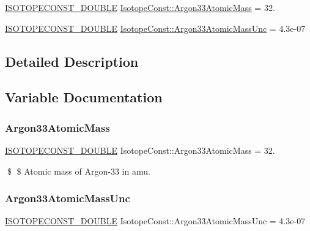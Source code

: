 \begin{DoxyCompactItemize}
\item 
\mbox{\hyperlink{group___isotope_const-_macros_ga8f45a7272ce02c0b4c65c44636ed719a}{I\+S\+O\+T\+O\+P\+E\+C\+O\+N\+S\+T\+\_\+\+D\+O\+U\+B\+LE}} \mbox{\hyperlink{group___isotope_const-_argon-_ar33_ga501a2d137e565980b69fc04d0f89c6ff}{Isotope\+Const\+::\+Argon33\+Atomic\+Mass}} = 32.
\item 
\mbox{\hyperlink{group___isotope_const-_macros_ga8f45a7272ce02c0b4c65c44636ed719a}{I\+S\+O\+T\+O\+P\+E\+C\+O\+N\+S\+T\+\_\+\+D\+O\+U\+B\+LE}} \mbox{\hyperlink{group___isotope_const-_argon-_ar33_ga08c0b36f327bdc880ab91e1aaa5e4d12}{Isotope\+Const\+::\+Argon33\+Atomic\+Mass\+Unc}} = 4.\+3e-\/07
\end{DoxyCompactItemize}


\subsection{Detailed Description}


\subsection{Variable Documentation}
\mbox{\label{group___isotope_const-_argon-_ar33_ga501a2d137e565980b69fc04d0f89c6ff}} 
\subsubsection{\texorpdfstring{Argon33\+Atomic\+Mass}{Argon33AtomicMass}}
{\footnotesize\ttfamily \mbox{\hyperlink{group___isotope_const-_macros_ga8f45a7272ce02c0b4c65c44636ed719a}{I\+S\+O\+T\+O\+P\+E\+C\+O\+N\+S\+T\+\_\+\+D\+O\+U\+B\+LE}} Isotope\+Const\+::\+Argon33\+Atomic\+Mass = 32.}

\$ \$ Atomic mass of Argon-\/33 in amu. \mbox{\label{group___isotope_const-_argon-_ar33_ga08c0b36f327bdc880ab91e1aaa5e4d12}} 
\subsubsection{\texorpdfstring{Argon33\+Atomic\+Mass\+Unc}{Argon33AtomicMassUnc}}
{\footnotesize\ttfamily \mbox{\hyperlink{group___isotope_const-_macros_ga8f45a7272ce02c0b4c65c44636ed719a}{I\+S\+O\+T\+O\+P\+E\+C\+O\+N\+S\+T\+\_\+\+D\+O\+U\+B\+LE}} Isotope\+Const\+::\+Argon33\+Atomic\+Mass\+Unc = 4.\+3e-\/07}

